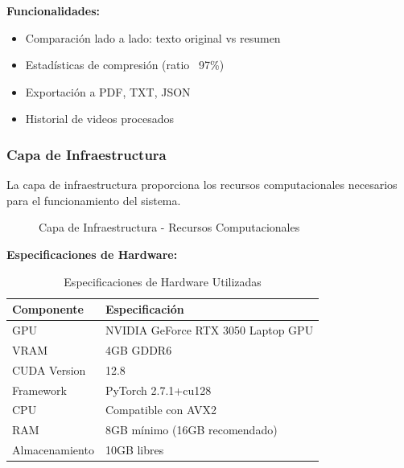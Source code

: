 \documentclass[12pt,a4paper]{article}
\begin{document}
\textbf{Funcionalidades:}
\begin{itemize}
    \item Comparación lado a lado: texto original vs resumen
    \item Estadísticas de compresión (ratio ~97\%)
    \item Exportación a PDF, TXT, JSON
    \item Historial de videos procesados
\end{itemize}

\newpage

\subsubsection{Capa de Infraestructura}

La capa de infraestructura proporciona los recursos computacionales necesarios para el funcionamiento del sistema.

\begin{figure}[H]
    \centering
    \caption{Capa de Infraestructura - Recursos Computacionales}
    \label{fig:capa_infraestructura}
\end{figure}

\textbf{Especificaciones de Hardware:}
\begin{table}[H]
\centering
\begin{tabular}{ll}
\toprule
\textbf{Componente} & \textbf{Especificación} \\
\midrule
GPU & NVIDIA GeForce RTX 3050 Laptop GPU \\
VRAM & 4GB GDDR6 \\
CUDA Version & 12.8 \\
Framework & PyTorch 2.7.1+cu128 \\
CPU & Compatible con AVX2 \\
RAM & 8GB mínimo (16GB recomendado) \\
Almacenamiento & 10GB libres \\
\bottomrule
\end{tabular}
\caption{Especificaciones de Hardware Utilizadas}
\label{tab:hardware}
\end{table}
\end{document}
